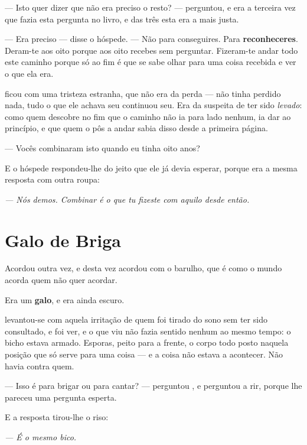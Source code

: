 \documentclass[livro.tex]{subfiles}
\begin{document}
\medskip
\noindent --- Isto quer dizer que não era preciso o resto? --- perguntou, e era
a terceira vez que fazia esta pergunta no livro, e das três esta era a mais
justa.

--- Era preciso --- disse o hóspede. --- Não para conseguires. Para
\textbf{reconheceres}. Deram-te aos oito porque aos oito recebes sem perguntar.
Fizeram-te andar todo este caminho porque só ao fim é que se sabe olhar para
uma coisa recebida e ver o que ela era.

\medskip
\noindent \Ben ficou com uma tristeza estranha, que não era da perda --- não
tinha perdido nada, tudo o que ele achava seu continuou seu. Era da suspeita de
ter sido \emph{levado}: como quem descobre no fim que o caminho não ia para
lado nenhum, ia dar ao princípio, e que quem o pôs a andar sabia disso desde a
primeira página.

\medskip
\noindent --- Vocês combinaram isto quando eu tinha oito anos?

E o hóspede respondeu-lhe do jeito que ele já devia esperar, porque era a mesma
resposta com outra roupa:

\begin{center}
\emph{--- Nós demos. Combinar é o que tu fizeste com aquilo desde então.}
\end{center}

\chapter{Galo de Briga}

Acordou outra vez, e desta vez acordou com o barulho, que é como o mundo acorda
quem não quer acordar.

Era um \textbf{galo}, e era ainda escuro.

\medskip
\noindent \Ben levantou-se com aquela irritação de quem foi tirado do sono
sem ter sido consultado, e foi ver, e o que viu não fazia sentido nenhum ao
mesmo tempo: o bicho estava armado. Esporas, peito para a frente, o corpo todo
posto naquela posição que só serve para uma coisa --- e a coisa não estava a
acontecer. Não havia contra quem.

\medskip
\noindent --- Isso é para brigar ou para cantar? --- perguntou \Ben , e
perguntou a rir, porque lhe pareceu uma pergunta esperta.

E a resposta tirou-lhe o riso:

\begin{center}
\emph{--- É o mesmo bico.}
\end{center}
\end{document}
